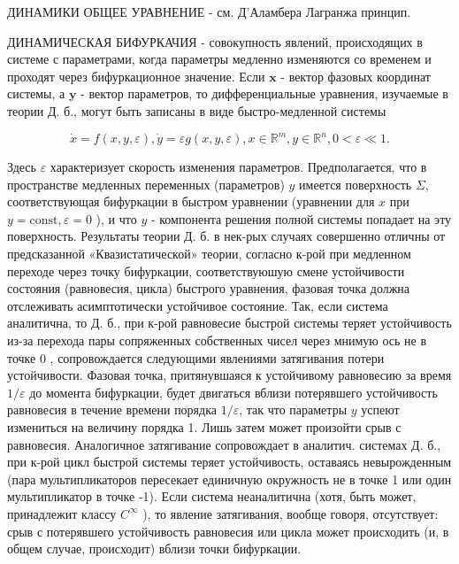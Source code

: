 \documentclass[10pt]{article}
\begin{document}
ДИНАМИКИ ОБЩЕЕ УРАВНЕНИЕ - см. Д'Аламбера Лагранжа принцип.



ДИНАМИЧЕСКАЯ БИФУРКАЧИЯ - совокупность явлений, происходящих в системе с параметрами, когда параметры медленно изменяются со временем и проходят через бифуркационное значение. Если $\boldsymbol{x}$ - вектор фазовых координат системы, а $\boldsymbol{y}$ - вектор параметров, то дифференциальные уравнения, изучаемые в теории Д. б., могут быть записаны в виде быстро-медленной системы



\[

\dot{x}=f(x, y, \varepsilon), \dot{y}=\varepsilon g(x, y, \varepsilon), x \in \mathbb{R}^{m}, y \in \mathbb{R}^{n}, 0<\varepsilon \ll 1 .

\]



Здесь $\varepsilon$ характеризует скорость изменения параметров. Предполагается, что в пространстве медленных переменных (параметров) $y$ имеется поверхность $\Sigma$, соответствующая бифуркации в быстром уравнении (уравнении для $x$ при $y=\mathrm{const}, \varepsilon=0$ ), и что $y$ - компонента решения полной системы попадает на эту поверхность. Результаты теории Д. б. в нек-рых случаях совершенно отличны от предсказанной «Квазистатической» теории, согласно к-рой при медленном переходе через точку бифуркации, соответствуюшую смене устойчивости состояния (равновесия, цикла) быстрого уравнения, фазовая точка должна отслеживать асимптотически устойчивое состояние. Так, если система аналитична, то Д. б., при к-рой равновесие быстрой системы теряет устойчивость из-за перехода пары сопряженных собственных чисел через мнимую ось не в точке 0 , сопровождается следующими явлениями затягивания потери устойчивости. Фазовая точка, притянувшаяся к устойчивому равновесию за время $1 / \varepsilon$ до момента бифуркации, будет двигаться вблизи потерявшего устойчивость равновесия в течение времени порядка $1 / \varepsilon$, так что параметры $y$ успеют измениться на величину порядка 1. Лишь затем может произойти срыв с равновесия. Аналогичное затягивание сопровождает в аналитич. системах Д. б., при к-рой цикл быстрой системы теряет устойчивость, оставаясь невырожденным (пара мультипликаторов пересекает единичную окружность не в точке 1 или один мультипликатор в точке -1). Если система неаналитична (хотя, быть может, принадлежит классу $C^{\infty}$ ), то явление затягивания, вообще говоря, отсутствует: срыв с потерявшего устойчивость равновесия или цикла может происходить (и, в общем случае, происходит) вблизи точки бифуркации.
\end{document}
